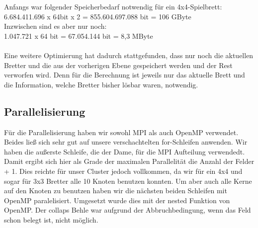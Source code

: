 \documentclass[
	12pt,
	a4paper,
	BCOR10mm,
	DIV14,
	listof=totoc,
	bibliography=totoc,
	headsepline
]{scrreprt}
\begin{document}
Anfangs war folgender Speicherbedarf notwendig für ein 4x4-Spielbrett:\\
6.684.411.696 x 64bit x 2 = 855.604.697.088 bit = 106 GByte \\
Inzwischen sind es aber nur noch: \\
1.047.721 x 64 bit = 67.054.144 bit = 8,3 MByte\\
\\ 
Eine weitere Optimierung hat dadurch stattgefunden, dass nur noch die aktuellen Bretter und die aus der vorherigen Ebene gespeichert werden und der Rest verworfen wird. Denn für die Berechnung ist jeweils nur das aktuelle Brett und die Information, welche Bretter bisher lösbar waren, notwendig.

\subsection{Parallelisierung}
Für die Parallelisierung haben wir sowohl MPI als auch OpenMP verwendet. Beides ließ sich sehr gut auf unsere verschachtelten for-Schleifen anwenden. Wir haben die außerste Schleife, die der Dame, für die MPI Aufteilung verwendedt. Damit ergibt sich hier als Grade der maximalen Parallelität die Anzahl der Felder + 1. Dies reichte für unser Cluster jedoch vollkommen, da wir für ein 4x4 und sogar für 3x3 Bretter alle 10 Knoten benutzen konnten. 
Um aber auch alle Kerne auf den Knoten zu benutzen haben wir die nächsten beiden Schleifen mit OpenMP paralelisiert. Umgesetzt wurde dies mit der nested Funktion von OpenMP. Der collaps Behle war aufgrund der Abbruchbedingung, wenn das Feld schon belegt ist, nicht möglich. 
\end{document}

